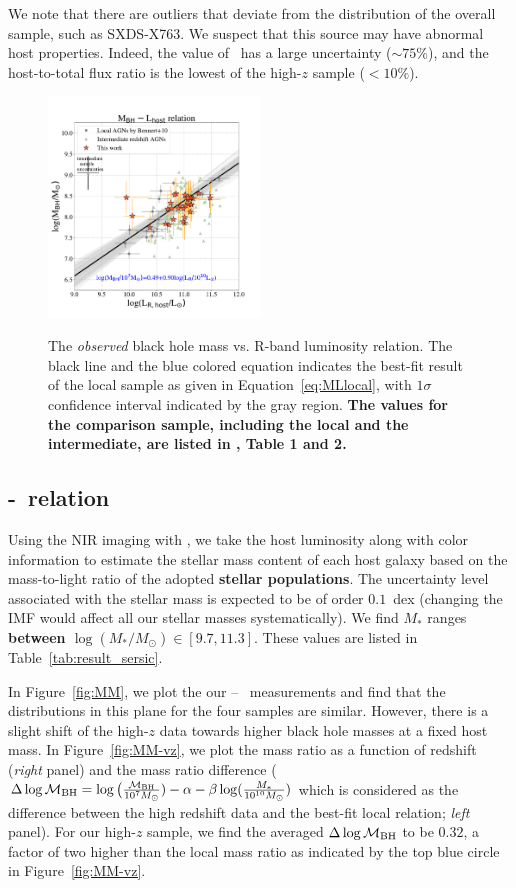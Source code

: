 \documentclass[apj]{emulateapj}
\begin{document}
We note that there are outliers that deviate from the distribution of the overall sample, such as SXDS-X763. We suspect that this source may have abnormal host properties. Indeed, the value of \Reff\ has a large uncertainty ($\sim 75\%$), and the host-to-total flux ratio is the lowest of the high-$z$ sample ($<10\%$). 

\begin{figure}
\centering
{\includegraphics[width=0.5\textwidth]{fig/MBH-L_obs.pdf}}
\caption{\label{fig:ML} 
The {\it observed} black hole mass vs. R-band luminosity relation. The black line and the blue colored equation indicates the best-fit result of the local sample as given in Equation~\ref{eq:MLlocal}, with $1\sigma$ confidence interval indicated by the gray region. {\bf The values for the comparison sample, including the local and the intermediate, are listed in \citet{Ding2017b}, Table 1 and 2.}
}
\end{figure} 

\subsection{\mbh-\smass\ relation}\label{sec:mm}

Using the NIR imaging with \hst, we take the host luminosity along with color information to estimate the stellar mass content of each host galaxy based on the mass-to-light ratio of the adopted  {\bf stellar populations}. The uncertainty level associated with the stellar mass is expected to be of order $0.1$~dex (changing the IMF would affect all our stellar masses systematically). We find $M_*$ ranges {\bf between $\log (M_*/M_{\odot}) \in [9.7, 11.3]$}. These values are listed in Table~\ref{tab:result_sersic}. 

In Figure~\ref{fig:MM}, we plot the our \mbh -- \smass\ measurements and find that the distributions in this plane for the four samples are similar. However, there is a slight shift of the high-$z$ data towards higher black hole masses at a fixed host mass. In Figure~\ref{fig:MM-vz}, we plot the mass ratio as a function of redshift ({\it right} panel) and the mass ratio difference ($\Delta \log \mathcal M_{\rm BH} = \log \big( \frac{\mathcal M_{\rm  BH}}{10^{7}M_{\odot}}) -\alpha-\beta\log(\frac{M_*}{10^{10}M_{\odot}})$ which is considered as the difference between the high redshift data and the best-fit local relation; {\it left} panel). For our high-$z$ sample, we find the averaged $\Delta \log \mathcal M_{\rm BH}$ to be $0.32$, a factor of two higher than the local mass ratio as indicated by the top blue circle in Figure~\ref{fig:MM-vz}.
\end{document}
